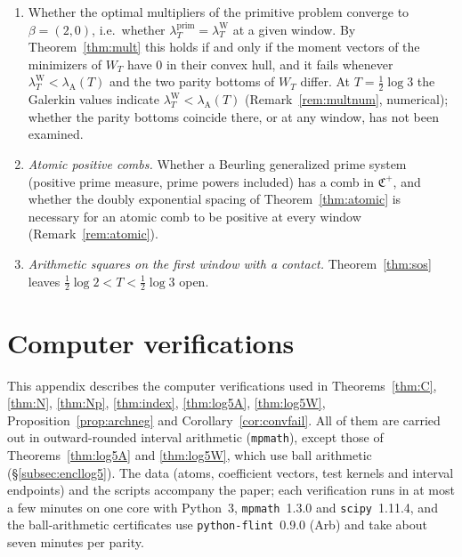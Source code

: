 \documentclass[11pt]{amsart}
\theoremstyle{definition}
\theoremstyle{remark}
\newcommand{\lamP}{\lambda^{\mathrm{prim}}_T}
\newcommand{\lamW}{\lambda^{\mathrm W}_T}
\newcommand{\lamA}{\lambda_{\mathrm A}(T)}
\newcommand{\Aconst}{\mathsf A_T}
\begin{document}
\begin{enumerate}
The general elementary bound is $\lamA\ge C_0-\Aconst$ (Lemma~\ref{lem:wit-basic}(v)). The
upper half is known only in the weak form of Corollary~\ref{cor:margin1}; the conjectural law
$-\log\lamP\asymp e^{2T}$ mentioned after Problem~\ref{prob:A} is an order-of-magnitude statement for the
logarithm, not a two-sided asymptotic with sign.
\item Whether the optimal multipliers of the primitive problem converge to $\beta=(2,0)$, i.e.\ whether
$\lamP=\lamW$ at a given window. By Theorem~\ref{thm:mult} this holds if and only if the moment vectors of the
minimizers of $W_T$ have $0$ in their convex hull, and it fails whenever $\lamW<\lamA$ and the two parity bottoms
of $W_T$ differ. At $T=\frac12\log3$ the Galerkin values indicate $\lamW<\lamA$ (Remark~\ref{rem:multnum},
numerical); whether the parity bottoms coincide there, or at any window, has not been examined.
\item \emph{Atomic positive combs.} Whether a Beurling generalized prime system (positive prime measure, prime powers
included) has a comb in $\mathfrak C^+$, and whether the doubly exponential spacing of Theorem~\ref{thm:atomic} is necessary
for an atomic comb to be positive at every window (Remark~\ref{rem:atomic}).
\item \emph{Arithmetic squares on the first window with a contact.} Theorem~\ref{thm:sos} leaves
$\frac12\log2<T<\frac12\log3$ open.
\end{enumerate}

\appendix

\section{Computer verifications}\label{app:encl}

This appendix describes the computer verifications used in Theorems~\ref{thm:C}, \ref{thm:N},
\ref{thm:Np}, \ref{thm:index}, \ref{thm:log5A}, \ref{thm:log5W}, Proposition~\ref{prop:archneg} and
Corollary~\ref{cor:convfail}. All of them are carried out in outward-rounded interval arithmetic
(\texttt{mpmath}), except those of Theorems~\ref{thm:log5A} and \ref{thm:log5W}, which use ball arithmetic
(\S\ref{subsec:encllog5}). The data (atoms, coefficient vectors, test kernels and interval endpoints) and the
scripts accompany the paper; each verification runs in at most a few minutes on one core with Python~3,
\texttt{mpmath}~1.3.0 and \texttt{scipy}~1.11.4, and the ball-arithmetic certificates use
\texttt{python-flint}~0.9.0 (Arb) and take about seven minutes per parity.
\end{document}
